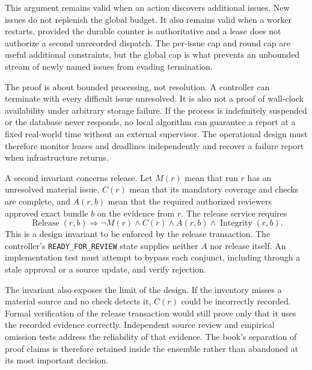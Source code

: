 This argument remains valid when an action discovers additional issues. New
issues do not replenish the global budget. It also remains valid when a worker
restarts, provided the durable counter is authoritative and a lease does not
authorize a second unrecorded dispatch. The per-issue cap and round cap are useful
additional constraints, but the global cap is what prevents an unbounded stream
of newly named issues from evading termination.


The proof is about bounded processing, not resolution. A controller can terminate
with every difficult issue unresolved. It is also not a proof of wall-clock
availability under arbitrary storage failure. If the process is indefinitely
suspended or the database never responds, no local algorithm can guarantee a
report at a fixed real-world time without an external supervisor. The operational
design must therefore monitor leases and deadlines independently and recover a
failure report when infrastructure returns.

A second invariant concerns release. Let $M(r)$ mean that run $r$ has an unresolved
material issue, $C(r)$ mean that its mandatory coverage and checks are complete,
and $A(r,b)$ mean that the required authorized reviewers approved exact bundle
$b$ on the evidence from $r$. The release service requires
\begin{equation}
 \operatorname{Release}(r,b)\Longrightarrow
 \neg M(r)\land C(r)\land A(r,b)\land\operatorname{Integrity}(r,b).
 \label{eq:ensemble-release}
\end{equation}
This is a design invariant to be enforced by the release transaction. The
controller's \texttt{READY\_FOR\_REVIEW} state supplies neither $A$ nor release
itself. An implementation test must attempt to bypass each conjunct, including
through a stale approval or a source update, and verify rejection.

The invariant also exposes the limit of the design. If the inventory misses a
material source and no check detects it, $C(r)$ could be incorrectly recorded.
Formal verification of the release transaction would still prove only that it
uses the recorded evidence correctly. Independent source review and empirical
omission tests address the reliability of that evidence. The book's separation
of proof claims is therefore retained inside the ensemble rather than abandoned
at its most important decision.


